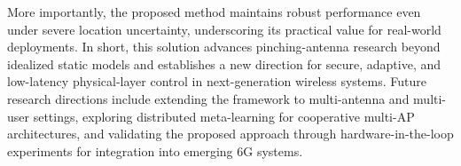 \documentclass[journal,10pt]{IEEEtran}
\begin{document}
More importantly, the proposed method maintains robust performance even under severe location uncertainty, underscoring its practical value for real-world deployments.
In short, this solution advances pinching-antenna research beyond idealized static models and establishes a new direction for secure, adaptive, and low-latency physical-layer control in next-generation wireless systems. Future research directions include extending the framework to multi-antenna and multi-user settings, exploring distributed meta-learning for cooperative multi-AP architectures, and validating the proposed approach through hardware-in-the-loop experiments for integration into emerging 6G systems.








\end{document}
